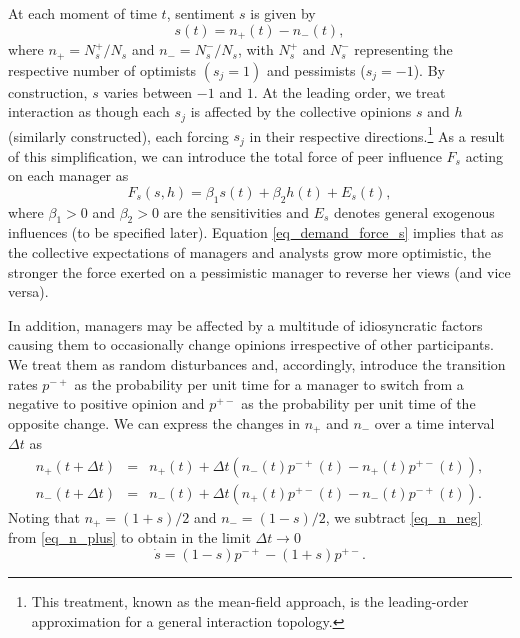 \documentclass[authoryear, review]{elsarticle}
\begin{document}
At each moment of time $t$, sentiment $s$ is given by
\begin{equation}\label{eq_s_first}
    s(t) =n_{+}(t) -n_{-}(t),
\end{equation}
where $n_{+}={N_{s}^{+}}/{N_{s}}$ and $n_{-}={N_{s}^{-}}/{N_{s}}$, with $N_{s}^{+}$ and $N_{s}^{-}$ representing the respective number of optimists $(s_{j}=1)$ and pessimists ($s_{j}=-1$). By construction, $s$ varies between $-1$ and $1$. At the leading order, we treat interaction as though each $s_j$ is affected by the collective opinions $s$ and $h$ (similarly constructed), each forcing $s_j$ in their respective directions.\footnote{
	This treatment, known as the mean-field approach, is the leading-order approximation for a general interaction topology.
} As a result of this simplification, we can introduce the total force of peer influence $F_s$ acting on each manager as 
\begin{equation}\label{eq_demand_force_s}
F_{s}(s,h) = \beta _{1}s(t) + \beta _{2}h(t) +E_{s}(t),
\end{equation}
where $\beta _{1}>0$ and $\beta _{2}>0$ are the sensitivities and $E_s$ denotes general exogenous influences (to be specified later). Equation \eqref{eq_demand_force_s} implies that as the collective expectations of managers and analysts grow more optimistic, the stronger the force exerted on a pessimistic manager to reverse her views (and vice versa).

In addition, managers may be affected by a multitude of idiosyncratic factors causing them to occasionally change opinions irrespective of other participants. We treat them as random disturbances and, accordingly, introduce the transition rates $p^{-+}$ as the probability per unit time for a manager to switch from a negative to positive opinion and $p^{+-}$ as the probability per unit time of the opposite change. We can express the changes in $n_+$ and $n_-$ over a time interval $\Delta t$ as
\begin{eqnarray}\label{eq_n_transition}
n_+(t+\Delta t) &=& n_+(t) + \Delta t\left(n_-(t)p^{-+}(t) - n_+(t)p^{+-}(t)\right)\label{eq_n_plus},\\
n_-(t+\Delta t) &=& n_-(t) + \Delta t\left(n_+(t)p^{+-}(t) - n_-(t)p^{-+}(t)\right)\label{eq_n_neg}.
\end{eqnarray}
Noting that $n_+=(1+s)/2$ and $n_-=(1-s)/2$, we subtract \eqref{eq_n_neg} from \eqref{eq_n_plus} to obtain in the limit $\Delta t \rightarrow 0$ 
\begin{equation}\label{eq_s_rates}
\dot{s} = (1-s)p^{-+} - (1+s)p^{+-}.
\end{equation}
\end{document}
